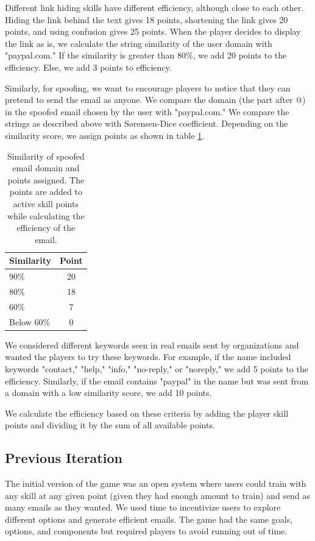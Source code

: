 Different link hiding skills have different efficiency, although close to each other. Hiding the link behind the text gives 18 points, shortening the link gives 20 points, and using confusion gives 25 points. When the player decides to display the link as is, we calculate the string similarity of the user domain with "paypal.com." If the similarity is greater than 80\%, we add 20 points to the efficiency. Else, we add 3 points to efficiency.

Similarly, for spoofing, we want to encourage players to notice that they can pretend to send the email as anyone. We compare the domain (the part after @) in the spoofed email chosen by the user with "paypal.com." We compare the strings as described above with Sørensen-Dice coefficient. Depending on the similarity score, we assign points as shown in table \ref{tab:similarity_spoofed}.

\begin{table}[!ht]
    \centering
    \begin{tabular}{l c}
        \hline
        Similarity & Point \\
        \hline
        90\%       & 20    \\
        80\%       & 18    \\
        60\%       & 7     \\
        Below 60\% & 0     \\
        \hline
    \end{tabular}%
    \caption[Similarity of spoofed email domain and points assigned]{Similarity of spoofed email domain and points assigned. The points are added to active skill points while calculating the efficiency of the email.}
    \label{tab:similarity_spoofed}
\end{table}

We considered different keywords seen in real emails sent by organizations and wanted the players to try these keywords. For example, if the name included keywords "contact," "help," "info," "no-reply," or "noreply," we add 5 points to the efficiency. Similarly, if the email contains "paypal" in the name but was sent from a domain with a low similarity score, we add 10 points.

We calculate the efficiency based on these criteria by adding the player skill points and dividing it by the sum of all available points.

\subsection{Previous Iteration}
The initial version of the game was an open system where users could train with any skill at any given point (given they had enough amount to train) and send as many emails as they wanted. We used time to incentivize users to explore different options and generate efficient emails. The game had the same goals, options, and components but required players to avoid running out of time.

